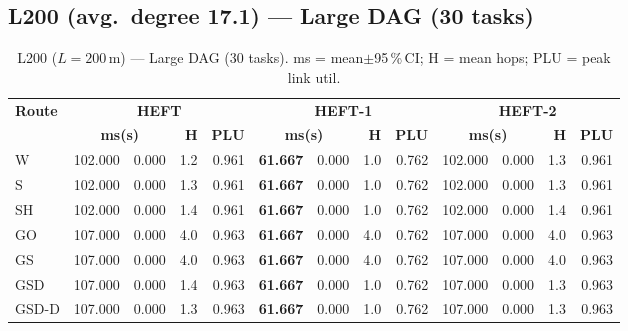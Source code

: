 \documentclass[11pt]{article}
\newcommand{\win}[1]{\textcolor{green!50!black}{\textbf{#1}}}
\newcommand{\bad}[1]{\textcolor{red!70!black}{#1}}
\begin{document}
\subsection{L200 (avg.\ degree 17.1) --- Large DAG (30 tasks)}
\begin{table}[H]\centering\small
\begin{tabular}{l r@{$\pm$}l r r r@{$\pm$}l r r r@{$\pm$}l r r}
\toprule
\textbf{Route} & \multicolumn{4}{c}{\textbf{HEFT}} & \multicolumn{4}{c}{\textbf{HEFT-1}} & \multicolumn{4}{c}{\textbf{HEFT-2}} \\
\cmidrule(lr){2-5}\cmidrule(lr){6-9}\cmidrule(lr){10-13}
& \multicolumn{2}{c}{\textbf{ms(s)}} & \textbf{H} & \textbf{PLU}& \multicolumn{2}{c}{\textbf{ms(s)}} & \textbf{H} & \textbf{PLU}& \multicolumn{2}{c}{\textbf{ms(s)}} & \textbf{H} & \textbf{PLU} \\
\midrule
  W & 102.000 & 0.000 & 1.2 & 0.961 & \win{61.667} & 0.000 & 1.0 & 0.762 & 102.000 & 0.000 & 1.3 & 0.961 \\
  S & 102.000 & 0.000 & 1.3 & 0.961 & \win{61.667} & 0.000 & 1.0 & 0.762 & 102.000 & 0.000 & 1.3 & 0.961 \\
  SH & 102.000 & 0.000 & 1.4 & 0.961 & \win{61.667} & 0.000 & 1.0 & 0.762 & 102.000 & 0.000 & 1.4 & 0.961 \\
  GO & \bad{107.000} & 0.000 & 4.0 & 0.963 & \win{61.667} & 0.000 & 4.0 & 0.762 & \bad{107.000} & 0.000 & 4.0 & 0.963 \\
  GS & \bad{107.000} & 0.000 & 4.0 & 0.963 & \win{61.667} & 0.000 & 4.0 & 0.762 & \bad{107.000} & 0.000 & 4.0 & 0.963 \\
  GSD & \bad{107.000} & 0.000 & 1.4 & 0.963 & \win{61.667} & 0.000 & 1.0 & 0.762 & \bad{107.000} & 0.000 & 1.3 & 0.963 \\
  GSD-D & \bad{107.000} & 0.000 & 1.3 & 0.963 & \win{61.667} & 0.000 & 1.0 & 0.762 & \bad{107.000} & 0.000 & 1.3 & 0.963 \\
\bottomrule\end{tabular}
\caption{L200 ($L=200$\,m) --- Large DAG (30 tasks). ms = mean$\pm$95\,\%\,CI; H = mean hops; PLU = peak link util.}
\end{table}
\end{document}
